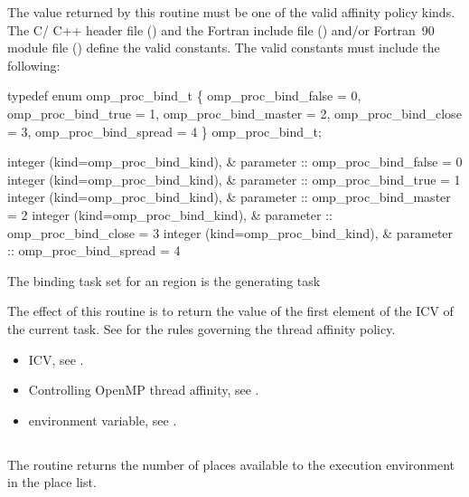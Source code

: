 \constraints
The value returned by this routine must be one of the valid affinity policy kinds. The C/
C++ header file () and the Fortran include file () and/or Fortran~90 
module file () define the valid constants. The valid constants must include the 
following:

\ccppspecificstart
\begin{codepar}
typedef enum omp\_proc\_bind\_t \{
  omp\_proc\_bind\_false = 0,
  omp\_proc\_bind\_true = 1,
  omp\_proc\_bind\_master = 2,
  omp\_proc\_bind\_close = 3,
  omp\_proc\_bind\_spread = 4
\} omp\_proc\_bind\_t;
\end{codepar}
\ccppspecificend

\fortranspecificstart
\begin{codepar}
integer (kind=omp\_proc\_bind\_kind), &
                parameter :: omp\_proc\_bind\_false = 0
integer (kind=omp\_proc\_bind\_kind), &
                parameter :: omp\_proc\_bind\_true = 1
integer (kind=omp\_proc\_bind\_kind), &
                parameter :: omp\_proc\_bind\_master = 2
integer (kind=omp\_proc\_bind\_kind), &
                parameter :: omp\_proc\_bind\_close = 3
integer (kind=omp\_proc\_bind\_kind), &
                parameter :: omp\_proc\_bind\_spread = 4
\end{codepar}
\fortranspecificend

\binding
The binding task set for an  region is the generating task

\effect
The effect of this routine is to return the value of the first element of the  ICV 
of the current task. See  
for the rules governing the thread affinity policy.

\crossreferences
\begin{itemize}
\item {} ICV, see 
.

\item Controlling OpenMP thread affinity, see 
. 

\item {} environment variable, see 
.
\end{itemize}




\subsection{}
\label{subsec:omp_get_num_places}
\summary
The  routine returns the number of places 
available to the execution environment in the place list.

